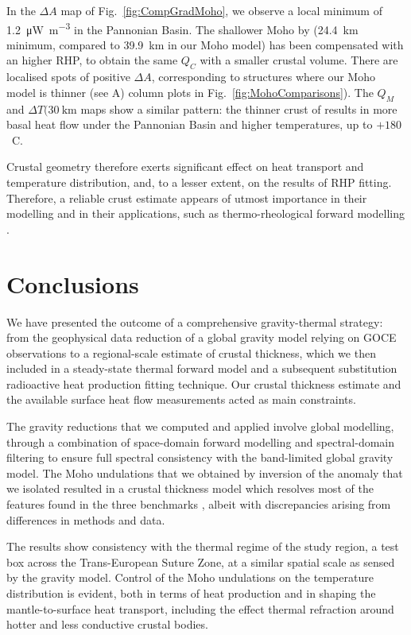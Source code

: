 {In the $\Delta A$ map of Fig.~\ref{fig:CompGradMoho}, we observe a local minimum of \SI{1.2}{\micro \watt \per \cubic \metre} in the Pannonian Basin.
The shallower Moho by \textcite{Grad2009} (24.4~km minimum, compared to 39.9~km in our Moho model) has been compensated with an higher RHP, to obtain the same $Q_C$ with a smaller crustal volume.
There are localised spots of positive $\Delta A$, corresponding to structures where our Moho model is thinner (see A) column plots in Fig.~\ref{fig:MohoComparisons}).
The $Q_M$ and $\Delta T(30~\mathrm{km}$ maps show a similar pattern: the thinner crust of \textcite{Grad2009} results in more basal heat flow under the Pannonian Basin and higher temperatures, up to $+180$~\textdegree C.

Crustal geometry therefore exerts significant effect on heat transport and temperature distribution, and, to a lesser extent, on the results of RHP fitting.
Therefore, a reliable crust estimate appears of utmost importance in their modelling and in their applications, such as thermo-rheological forward modelling \parencite[e.g. ][]{Burov1995}.

\section{Conclusions}
\label{s:Appl:Concl}

We have presented the outcome of a comprehensive gravity-thermal strategy: from the geophysical data reduction of a global gravity model relying on GOCE observations to a regional-scale estimate of crustal thickness, which we then included in a steady-state thermal forward model and a subsequent substitution radioactive heat production fitting technique.
Our crustal thickness estimate and the available surface heat flow measurements acted as main constraints.

The gravity reductions that we computed and applied involve global modelling, through a combination of space-domain forward modelling and spectral-domain filtering to ensure full spectral consistency with the band-limited global gravity model.
The Moho undulations that we obtained by inversion of the anomaly that we isolated resulted in a crustal thickness model which resolves most of the features found in the three benchmarks \parencites{Grad2009}{Reguzzoni2015}{Pasyanos2014}, albeit with discrepancies arising from differences in methods and data.

The results show consistency with the thermal regime of the study region, a test box across the Trans-European Suture Zone, at a similar spatial scale as sensed by the gravity model.
Control of the Moho undulations on the temperature distribution is evident, both in terms of heat production and in shaping the mantle-to-surface heat transport, including the effect thermal refraction around hotter and less conductive crustal bodies.

}
